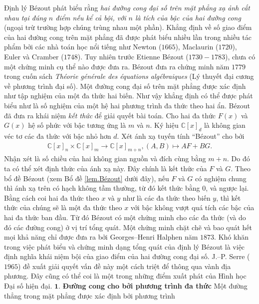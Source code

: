 \begin{multicols}{2}
	\vskip 0.1cm
	Định lý Bézout phát biểu rằng {\em hai đường cong đại số trên mặt phẳng xạ ảnh cắt nhau tại đúng $n$ điểm nếu kể cả bội, với $n$ là tích của bậc của hai đường cong} (ngoại trừ trường hợp chúng trùng nhau một phần). 
	\vskip 0.1cm
	Khẳng định về số giao điểm của hai đường cong trên mặt phẳng đã được phát biểu nhiều lần trong nhiều tác phẩm bởi các nhà toán học nổi tiếng như Newton ($1665$), Maclaurin ($1720$), Euler và Cramber ($1748$). Tuy nhiên trước Etienne Bézout ($1730-1783$), chưa có một chứng minh cụ thể nào được đưa ra. 
	\vskip 0.1cm
	Bézout đưa ra chứng minh năm $1779$ trong cuốn sách {\em Théorie générale des équations algébraiques} (Lý thuyết đại cương về phương trình đại số). Một đường cong đại số trên mặt phẳng được xác định như tập nghiệm của một đa thức hai biến. Như vậy khẳng định có thể được phát biểu như là số nghiệm của một hệ hai phương trình đa thức theo hai ẩn.
	Bézout đã đưa ra khái niệm {\em kết thức} để giải quyết bài toán. Cho hai đa thức $F(x)$ và $G(x)$ hệ số phức với bậc tương ứng là $m$ và $n$. Ký hiệu $\mathbb C[x]_d$ là không gian véc tơ các đa thức với bậc nhỏ hơn $d$. Xét ánh xạ tuyến tính ``Bézout'' cho bởi 
	\begin{align*}
		\mathbb C[x]_n\!\times\! \mathbb C[x]_m \!\rightarrow\!  \mathbb C[x]_{m\!+\!n},
		(A,B)\!\mapsto\! AF\!+\!BG.
	\end{align*}
	Nhận xét là số chiều của hai không gian nguồn và đích cùng bằng $m+n$. Do đó ta có thể xét định thức của ánh xạ này. Đây chính là kết thức của $F$ và $G$. Theo bổ đề Bézout (xem Bổ đề \ref{lem.Bézout} dưới đây), nếu $F$ và $G$ có nghiệm chung thì ánh xạ trên có hạch không tầm thường, từ đó kết thức bằng $0$, và ngược lại. 
	\vskip 0.1cm
	Bằng cách coi hai đa thức theo $x$ và $y$ như là các đa thức theo biến $y$, thì kết thức của chúng sẽ là một đa thức theo $x$ với bậc không vượt quá tích các bậc của hai đa thức ban đầu. Từ đó Bézout có một chứng minh cho các đa thức (và do đó các đường cong) ở vị trí tổng quát. 
	\vskip 0.1cm
	Một chứng minh chặt chẽ và bao quát hết mọi khả năng chỉ được đưa ra bởi Georges--Henri Halphen năm $1873$. 
	Khó khăn trong việc phát biểu và chứng minh dạng tổng quát của định lý Bézout là việc định nghĩa khái niệm bội của giao điểm của hai đường cong đại số. J.--P. Serre ($1965$) đề xuất giải quyết vấn đề này một cách triệt để thông qua vành địa phương. Đây cũng có thể coi là một trong những điểm xuất phát của Hình học Đại số hiện đại. 
	\vskip 0.1cm
	$\pmb{1.}$ \textbf{\color{duongvaotoanhoc}Đường cong cho bởi phương trình đa thức}
	\vskip 0.1cm
	Một đường thẳng trong mặt phẳng được xác định bởi phương trình  

\end{multicols}
